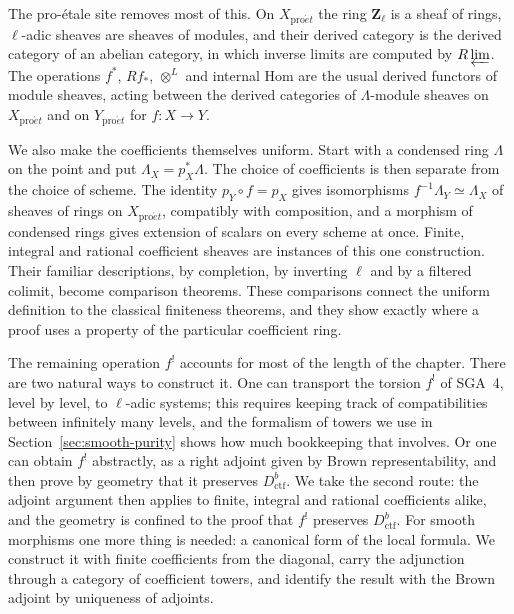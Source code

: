 \documentclass[11pt,a4paper]{article}
\numberwithin{equation}{section}
\theoremstyle{definition}
\theoremstyle{remark}
\newcommand{\Zl}{\mathbf Z_\ell}
\newcommand{\proet}{\mathrm{pro}\acute{e}t}
\newcommand{\Dctf}{D^b_{\mathrm{ctf}}}
\begin{document}
The pro-\'etale site removes most of this. On $X_{\proet}$ the ring
$\Zl$ is a sheaf of rings, $\ell$-adic sheaves are
sheaves of modules, and their derived category is the derived
category of an abelian category, in which inverse limits are computed by $R\varprojlim$. The
operations $f^*$, $Rf_*$, $\otimes^L$ and internal Hom are the usual
derived functors of module sheaves, acting between the derived
categories of $\Lambda$-module sheaves on $X_{\proet}$ and on
$Y_{\proet}$ for $f\colon X\to Y$.

We also make the coefficients themselves uniform. Start with a condensed
ring $\Lambda$ on the point and put $\Lambda_X=p_X^*\Lambda$. The choice
of coefficients is then separate from the choice of scheme. The identity
$p_Y\circ f=p_X$ gives isomorphisms $f^{-1}\Lambda_Y\simeq\Lambda_X$ of
sheaves of rings on $X_{\proet}$, compatibly with composition, and a morphism of condensed rings gives
extension of scalars on every scheme at once. Finite, integral and
rational coefficient sheaves are instances of this one construction.
Their familiar descriptions, by completion, by inverting $\ell$ and by
a filtered colimit, become comparison theorems. These comparisons
connect the uniform definition to the classical finiteness theorems,
and they show exactly where a proof uses a property of the particular
coefficient ring.

The remaining operation $f^!$ accounts for most of the length of the
chapter. There are two natural ways to construct it. One can transport
the torsion $f^!$ of SGA~4, level by level, to $\ell$-adic systems;
this requires keeping track of compatibilities between infinitely many
levels, and the formalism of towers we use in
Section~\ref{sec:smooth-purity} shows how much bookkeeping that
involves. Or one can obtain $f^!$ abstractly, as a right adjoint given
by Brown representability, and then prove by geometry that it preserves
$\Dctf$. We take the second route: the adjoint argument then applies to
finite, integral and rational coefficients alike, and the geometry is
confined to the proof that $f^!$ preserves $\Dctf$. For smooth morphisms one more
thing is needed: a canonical form of the local formula. We construct it
with finite coefficients from the diagonal, carry the adjunction through
a category of coefficient towers, and identify the result with the
Brown adjoint by uniqueness of adjoints.
\end{document}
